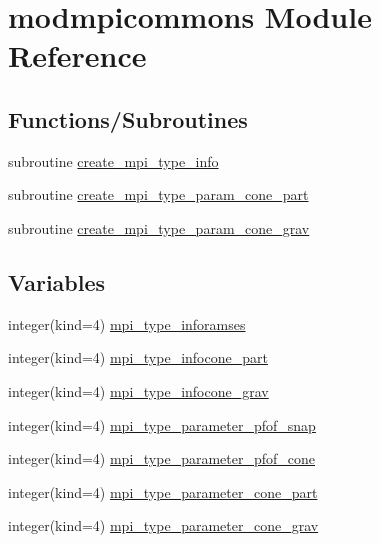 \hypertarget{namespacemodmpicommons}{}\section{modmpicommons Module Reference}
\label{namespacemodmpicommons}
\subsection*{Functions/\+Subroutines}
\begin{DoxyCompactItemize}
\item 
subroutine \hyperlink{namespacemodmpicommons_a5a540130814e6928b787a72f0dd0eaa9}{create\+\_\+mpi\+\_\+type\+\_\+info}
\item 
subroutine \hyperlink{namespacemodmpicommons_afff785e5098b377ea1b360480c9f5757}{create\+\_\+mpi\+\_\+type\+\_\+param\+\_\+cone\+\_\+part}
\item 
subroutine \hyperlink{namespacemodmpicommons_a32e80100f7e49ad7eed9bac495789eb6}{create\+\_\+mpi\+\_\+type\+\_\+param\+\_\+cone\+\_\+grav}
\end{DoxyCompactItemize}
\subsection*{Variables}
\begin{DoxyCompactItemize}
\item 
integer(kind=4) \hyperlink{namespacemodmpicommons_a7209ec50a2345627928ec7f683f09392}{mpi\+\_\+type\+\_\+inforamses}
\item 
integer(kind=4) \hyperlink{namespacemodmpicommons_a47d1927be23cfeeb8ca1750bfc8667ca}{mpi\+\_\+type\+\_\+infocone\+\_\+part}
\item 
integer(kind=4) \hyperlink{namespacemodmpicommons_afa04cc242f5aeb82cc0dea5a175ec366}{mpi\+\_\+type\+\_\+infocone\+\_\+grav}
\item 
integer(kind=4) \hyperlink{namespacemodmpicommons_a330add7c6795d1bcbf3b4679fbe28db5}{mpi\+\_\+type\+\_\+parameter\+\_\+pfof\+\_\+snap}
\item 
integer(kind=4) \hyperlink{namespacemodmpicommons_a5fc1e7c8e04f9a9c5f7e0e07a5141c8d}{mpi\+\_\+type\+\_\+parameter\+\_\+pfof\+\_\+cone}
\item 
integer(kind=4) \hyperlink{namespacemodmpicommons_a0aa6354f5e5b7ccf30b1a8039a39fbef}{mpi\+\_\+type\+\_\+parameter\+\_\+cone\+\_\+part}
\item 
integer(kind=4) \hyperlink{namespacemodmpicommons_ab28bb5018211e0f3fef44b29db2e6b13}{mpi\+\_\+type\+\_\+parameter\+\_\+cone\+\_\+grav}
\end{DoxyCompactItemize}


